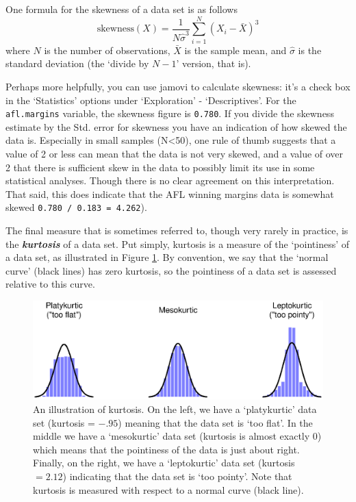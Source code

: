 \documentclass[
]{book}
\begin{document}
One formula for the skewness of a data set is as follows
\[
\mbox{skewness}(X) = \frac{1}{N \hat{\sigma}^3} \sum_{i=1}^N (X_i - \bar{X})^3
\]
where \(N\) is the number of observations, \(\bar{X}\) is the sample mean, and \(\hat{\sigma}\) is the standard deviation (the `divide by \(N-1\)' version, that is).

Perhaps more helpfully, you can use jamovi to calculate skewness: it's a check box in the `Statistics' options under `Exploration' - `Descriptives'. For the \texttt{afl.margins} variable, the skewness figure is \texttt{0.780}. If you divide the skewness estimate by the Std. error for skewness you have an indication of how skewed the data is. Especially in small samples (N\textless50), one rule of thumb suggests that a value of 2 or less can mean that the data is not very skewed, and a value of over 2 that there is sufficient skew in the data to possibly limit its use in some statistical analyses. Though there is no clear agreement on this interpretation. That said, this does indicate that the AFL winning margins data is somewhat skewed \texttt{0.780\ /\ 0.183\ =\ 4.262}).

The final measure that is sometimes referred to, though very rarely in practice, is the \textbf{\emph{kurtosis}} of a data set. Put simply, kurtosis is a measure of the `pointiness' of a data set, as illustrated in Figure \ref{fig:kurtosis}. By convention, we say that the `normal curve' (black lines) has zero kurtosis, so the pointiness of a data set is assessed relative to this curve.

\begin{figure}
\centering
\includegraphics{img/descriptives/kurtosis.eps}
\caption{\label{fig:kurtosis}An illustration of kurtosis. On the left, we have a `platykurtic' data set (kurtosis = \(-.95\)) meaning that the data set is `too flat'. In the middle we have a `mesokurtic' data set (kurtosis is almost exactly 0) which means that the pointiness of the data is just about right. Finally, on the right, we have a `leptokurtic' data set (kurtosis \(= 2.12\)) indicating that the data set is `too pointy'. Note that kurtosis is measured with respect to a normal curve (black line).}
\end{figure}
\end{document}
